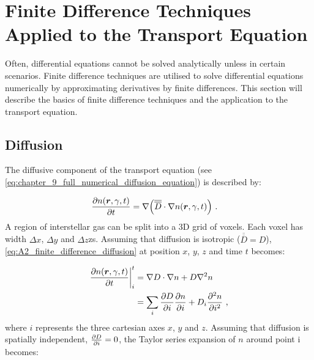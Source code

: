 \chapter{Finite Difference Techniques Applied to the Transport Equation} \label{sec:A2_finite_difference}

Often, differential equations cannot be solved analytically unless in certain scenarios. Finite difference techniques are utilised to solve differential equations numerically by approximating derivatives by finite differences. This section will describe the basics of finite difference techniques and the application to the transport equation.

\section{Diffusion} \label{sec:A2_diffusion}

The diffusive component of the transport equation (see \autoref{eq:chapter_9_full_numerical_diffusion_equation}) is described by:

\begin{equation}
    \begin{aligned}
    \pdv{n\qty(\boldsymbol{r},\gamma,t)}{t}&=\nabla \qty(\overline{\overline{D}}\cdot\nabla n\qty(\boldsymbol{r},\gamma,t))\text{ .} 
    \end{aligned} \label{eq:A2_finite_difference_diffusion}
\end{equation}
\noindent A region of interstellar gas can be split into a 3D grid of voxels. Each voxel has width $\Delta x$, $\Delta y$ and $\Delta z$zs. Assuming that diffusion is isotropic ($\overline{\overline{D}}=D$), \autoref{eq:A2_finite_difference_diffusion} at position $x$, $y$, $z$ and time $t$ becomes:

\begin{equation}
    \begin{aligned}
    \pdv{n\qty(\boldsymbol{r},\gamma,t)}{t}\bigg|_{i}^t &= \nabla D\cdot\nabla n + D\nabla^2 n \\
    &= \sum_{i} \pdv{D}{i}\pdv{n}{i}+ D_i\pdv[2]{n}{i}\text{ ,} 
    \end{aligned} \label{eq:A2_finite_difference_diffusion_expanded}
\end{equation}
\noindent where $i$ represents the three cartesian axes $x$, $y$ and $z$. Assuming that diffusion is spatially independent, $\pdv{D}{i}=0$, the Taylor series expansion of $n$ around point i becomes:

